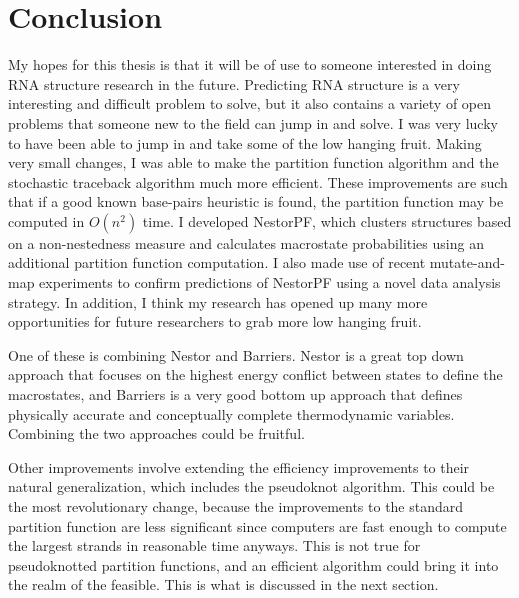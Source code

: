 \chapter{Conclusion}

My hopes for this thesis is that it will be of use to someone
interested in doing RNA structure research in the future. Predicting
RNA structure is a very interesting and difficult problem to solve,
but it also contains a variety of open problems that someone new to
the field can jump in and solve. I was very lucky to have been able to
jump in and take some of the low hanging fruit. Making very small
changes, I was able to make the partition function algorithm and the
stochastic traceback algorithm much more efficient. These improvements
are such that if a good known base-pairs heuristic is found, the
partition function may be computed in $O(n^2)$ time. I developed
NestorPF, which clusters structures based on a non-nestedness measure
and calculates macrostate probabilities using an additional partition
function computation. I also made use of recent mutate-and-map
experiments to confirm predictions of NestorPF using a novel data
analysis strategy. In addition, I think my research has opened up many
more opportunities for future researchers to grab more low hanging
fruit.

One of these is combining Nestor and Barriers. Nestor is a great top
down approach that focuses on the highest energy conflict between
states to define the macrostates, and Barriers is a very good bottom
up approach that defines physically accurate and conceptually complete
thermodynamic variables. Combining the two approaches could be
fruitful.

Other improvements involve extending the efficiency improvements to
their natural generalization, which includes the pseudoknot
algorithm. This could be the most revolutionary change, because the
improvements to the standard partition function are less significant
since computers are fast enough to compute the largest strands in
reasonable time anyways. This is not true for pseudoknotted partition
functions, and an efficient algorithm could bring it into the realm of
the feasible. This is what is discussed in the next section.

